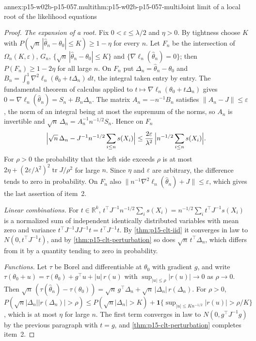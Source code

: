 \begin{annexitem}{annex:p15-w02b-p15-057.multi}{thm:p15-w02b-p15-057-multi}{Joint limit of a local root of the likelihood equations}
\begin{proof}
\emph{The expansion of a root.} Fix \(0<\varepsilon\leq\lambda/2\) and
\(\eta>0\). By tightness choose \(K\) with
\(P(\sqrt n\,|\widehat\theta_n-\theta_0|\leq K)\geq1-\eta\) for every
\(n\). Let \(F_n\) be the intersection of \(\Omega_n(K,\varepsilon)\),
\(G_n\), \(\{\sqrt n\,|\widehat\theta_n-\theta_0|\leq K\}\) and
\(\{\nabla\ell_n(\widehat\theta_n)=0\}\); then
\(P(F_n)\geq1-2\eta\) for all large \(n\). On \(F_n\) put
\(\Delta_n=\widehat\theta_n-\theta_0\) and
\(B_n=\int_0^1\nabla^2\ell_n(\theta_0+t\Delta_n)\,dt\), the integral taken
entry by entry. The fundamental theorem of calculus applied to
\(t\mapsto\nabla\ell_n(\theta_0+t\Delta_n)\) gives
\(0=\nabla\ell_n(\widehat\theta_n)=S_n+B_n\Delta_n\). The matrix
\(A_n=-n^{-1}B_n\) satisfies \(\|A_n-J\|\leq\varepsilon\), the norm of an
integral being at most the supremum of the norms, so \(A_n\) is invertible
and \(\sqrt n\,\Delta_n=A_n^{-1}n^{-1/2}S_n\). Hence on \(F_n\)
\[
 \Bigl|\sqrt n\,\Delta_n-J^{-1}n^{-1/2}\sum_{i\leq n}s(X_i)\Bigr|
 \leq\frac{2\varepsilon}{\lambda^2}\,\Bigl|n^{-1/2}\sum_{i\leq n}s(X_i)\Bigr| .
\]
For \(\rho>0\) the probability that the left side exceeds \(\rho\) is at
most \(2\eta+(2\varepsilon/\lambda^2)^2\operatorname{tr}J/\rho^2\) for
large \(n\). Since \(\eta\) and \(\varepsilon\) are arbitrary, the
difference tends to zero in probability. On \(F_n\) also
\(\|n^{-1}\nabla^2\ell_n(\widehat\theta_n)+J\|\leq\varepsilon\), which
gives the last assertion of item~2.

\emph{Linear combinations.} For \(t\in\mathbb R^k\),
\(t^{\top}J^{-1}n^{-1/2}\sum_is(X_i)=n^{-1/2}\sum_it^{\top}J^{-1}s(X_i)\)
is a normalized sum of independent identically distributed variables with
mean zero and variance \(t^{\top}J^{-1}JJ^{-1}t=t^{\top}J^{-1}t\). By
\cref{thm:p15-clt-iid} it converges in law to \(N(0,t^{\top}J^{-1}t)\),
and by \cref{thm:p15-clt-perturbation} so does
\(\sqrt n\,t^{\top}\Delta_n\), which differs from it by a quantity tending
to zero in probability.

\emph{Functions.} Let \(\tau\) be Borel and differentiable at
\(\theta_0\) with gradient \(g\), and write
\(\tau(\theta_0+u)=\tau(\theta_0)+g^{\top}u+|u|\,r(u)\) with
\(\sup_{|u|\leq\rho}|r(u)|\to0\) as \(\rho\to0\). Then
\(\sqrt n\,(\tau(\widehat\theta_n)-\tau(\theta_0))=\sqrt n\,g^{\top}\Delta_n
+\sqrt n\,|\Delta_n|\,r(\Delta_n)\). For \(\rho>0\),
\(P(\sqrt n|\Delta_n||r(\Delta_n)|>\rho)\leq P(\sqrt n|\Delta_n|>K)
+\mathbf 1\{\sup_{|u|\leq Kn^{-1/2}}|r(u)|>\rho/K\}\), which is at most
\(\eta\) for large \(n\). The first term converges in law to
\(N(0,g^{\top}J^{-1}g)\) by the previous paragraph with \(t=g\), and
\cref{thm:p15-clt-perturbation} completes item~2.


\end{proof}
\end{annexitem}
